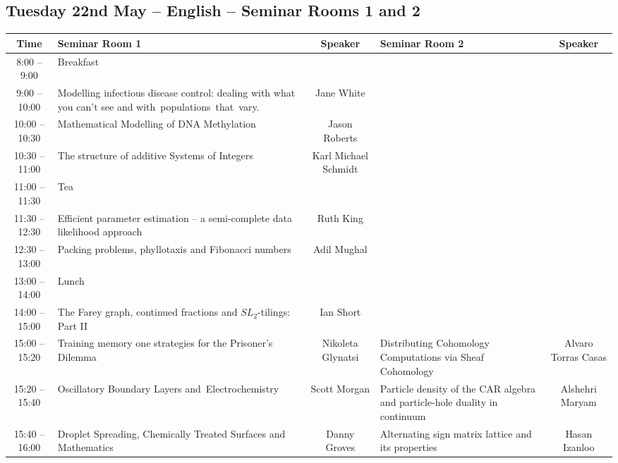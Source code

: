 \documentclass{article}
\begin{document}
\begin{landscape}

\section*{Tuesday 22nd May -- English -- Seminar Rooms 1 and 2}

\begin{center}
  \centering
  \begin{tabular}{c || p{8cm} | c|| p{8cm} | c }
   \toprule
   \textbf{Time} & \textbf{Seminar Room 1} & \textbf{Speaker} & \textbf{Seminar Room 2} & \textbf{Speaker}  \\
   \midrule
    8:00 -- 9:00 & \cellcolor{blue!25}Breakfast & &&\\
   \midrule
    9:00 -- 10:00 & Modelling infectious disease control:  dealing with what you can't see and with populations that vary. & Jane White && \\
   \midrule
    10:00 -- 10:30 &  {Mathematical Modelling  of DNA Methylation}  & Jason Roberts && \\
   \midrule
    10:30 -- 11:00 & The structure of additive Systems of Integers & Karl Michael Schmidt && \\
   \midrule
    11:00 -- 11:30 & \cellcolor{blue!25}Tea &  &&\\
   \midrule
    11:30 -- 12:30 & Efficient parameter estimation -- a semi-complete data likelihood approach & Ruth King &&\\
   \midrule
    12:30 -- 13:00 & Packing problems, phyllotaxis and Fibonacci numbers & Adil Mughal &&\\
   \midrule
    13:00 -- 14:00 & \cellcolor{blue!25}Lunch & &&\\
\midrule
    14:00 -- 15:00 & {The Farey graph, continued fractions and $SL_2$-tilings: Part II} & Ian Short & &  \\
    \midrule
    15:00 -- 15:20 & Training memory one strategies for the Prisoner's Dilemma & \makecell{Nikoleta \\Glynatsi} & Distributing Cohomology Computations via Sheaf Cohomology & Alvaro Torras Casas  \\
    \midrule
    15:20 -- 15:40 & Oscillatory Boundary Layers and Electrochemistry & Scott Morgan & Particle density of the CAR algebra and particle-hole duality in continuum & Alshehri Maryam  \\
    \midrule
    15:40 -- 16:00 & Droplet Spreading, Chemically Treated Surfaces and Mathematics & Danny Groves & Alternating sign matrix lattice and its properties & Hasan Izanloo  \\

\end{tabular}
\end{center}
\end{landscape}
\end{document}
